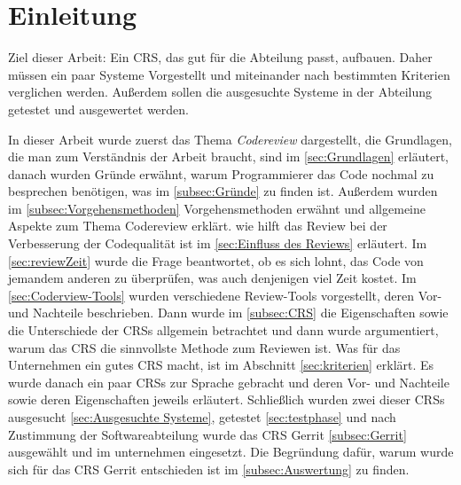 \newpage
\listoftodos

\section{Einleitung}
\label{sec:Einleitung}

Ziel dieser Arbeit: Ein \ac{CRS}, das gut für die Abteilung passt, aufbauen. Daher müssen ein paar Systeme Vorgestellt und miteinander nach bestimmten Kriterien verglichen werden. Außerdem sollen die ausgesuchte Systeme in der Abteilung getestet und ausgewertet werden.

In dieser Arbeit wurde zuerst das Thema \emph{Codereview} dargestellt, die Grundlagen, die man zum Verständnis der Arbeit braucht, sind im \cref{sec:Grundlagen} erläutert, danach wurden Gründe erwähnt, warum Programmierer das Code nochmal zu besprechen benötigen, was im \cref{subsec:Gründe} zu finden ist. Außerdem wurden im \cref{subsec:Vorgehensmethoden} Vorgehensmethoden erwähnt und allgemeine Aspekte zum Thema Codereview erklärt. wie hilft das Review bei der Verbesserung der Codequalität ist im \cref{sec:Einfluss des Reviews} erläutert. Im \cref{sec:reviewZeit} wurde die Frage beantwortet, ob es sich lohnt, das Code von jemandem anderen zu überprüfen, was auch denjenigen viel Zeit kostet.
Im \cref{sec:Coderview-Tools} wurden verschiedene Review-Tools vorgestellt, deren Vor- und Nachteile beschrieben. Dann wurde im \cref{subsec:CRS} die Eigenschaften sowie die Unterschiede der \acp{CRS} allgemein betrachtet und dann wurde argumentiert, warum das \ac{CRS} die sinnvollste Methode zum Reviewen ist. Was für das Unternehmen ein gutes \ac{CRS} macht, ist im Abschnitt \ref{sec:kriterien} erklärt. Es wurde danach ein paar \acp{CRS} zur Sprache gebracht und deren Vor- und Nachteile sowie deren Eigenschaften jeweils erläutert. Schließlich wurden zwei dieser \acp{CRS} ausgesucht \cref{sec:Ausgesuchte Systeme}, getestet \cref{sec:testphase} und nach Zustimmung der Softwareabteilung wurde das \ac{CRS} Gerrit \ref{subsec:Gerrit} ausgewählt und im unternehmen eingesetzt. Die Begründung dafür, warum wurde sich für das \ac{CRS} Gerrit entschieden ist im \cref{subsec:Auswertung} zu finden.